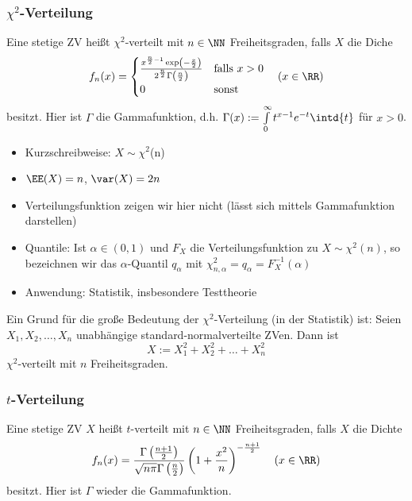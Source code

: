 \subsubsection{$ \chi^2 $-Verteilung}

 Eine stetige ZV heißt $ \chi^2 $-verteilt mit $ n \in \NN $ Freiheitsgraden, falls $ X $ die Diche 
$$f_n(x)=\begin{cases}
\frac{x^{\frac{n}{2}-1}\exp\left(-\frac{x}{2}\right)}{2^{\frac{n}{2}}\Gamma\left(\frac{n}{2}\right)} & \text{falls }x>0\\
0 & \text{sonst}
\end{cases} \quad (x\in \RR)$$
besitzt. Hier ist $\Gamma$ die Gammafunktion, d.h. $\Gamma(x):= \int\limits_{0}^{\infty}t^{x-1}e^{-t}\intd{t}$ für $x>0$.

\begin{itemize}
	\item Kurzschreibweise: $X\sim \chi^{2}$(n)
	\item $\EE(X)=n$, $\var(X)=2n$
	\item Verteilungsfunktion zeigen wir hier nicht (lässt sich mittels Gammafunktion darstellen)
	\item Quantile: Ist $\alpha\in (0,1)$ und $F_X$ die Verteilungsfunktion zu $X \sim \chi^{2}(n)$, so bezeichnen wir das $\alpha$-Quantil $q_\alpha$ mit $\chi^{2}_{n,\alpha}=q_{\alpha}=F_X^{-1}(\alpha)$
	\item Anwendung: Statistik, insbesondere Testtheorie
\end{itemize}

Ein Grund für die große Bedeutung der $ \chi^2 $-Verteilung (in der Statistik) ist:
 Seien $ X_1, X_2, \ldots, X_n $ unabhängige standard-normalverteilte ZVen. Dann ist 
$$ X:=X_1^{2} + X_2^{2}+\ldots + X_n^{2} $$
$ \chi^{2} $-verteilt mit $ n $ Freiheitsgraden.

\subsubsection{$ t $-Verteilung}

 Eine stetige ZV $X$ heißt $t$-verteilt mit $n\in \NN$ Freiheitsgraden, falls $X$ die Dichte 
\[ f_n(x)=\frac{\Gamma\left(\frac{n+1}{2}\right)}{\sqrt{n \pi}\Gamma\left(\frac{n}{2}\right)}\left(1+\frac{x^2}{n}\right)^{-\frac{n+1}{2}} \quad (x\in \RR) \]
besitzt. Hier ist $\Gamma$ wieder die Gammafunktion.

